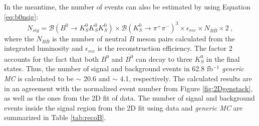 In the meantime, the number of events can also be estimated by using Equation \ref{eq:b0nsig}:
 \begin{equation}\label{eq:b0nsig}
  {N_{sig}}=
\mathcal{B}(B^0 \to K_S^0  K_S^0  K_S^0) \times {\mathcal{B}(K_S^0\to \pi^+\pi^-)^3\times
 	\epsilon_{rec}\times N_{B\bar{B}}\times 2} ~,
 \end{equation}
where the $N_{B\bar{B}}$ is the number of neutral $B$ meson pairs calculated from the integrated luminosity and $\epsilon_{rec}$ is the reconstruction efficiency. The factor 2 accounts for the fact that both $B^0$ and $\overline{B^0}$ can decay to three $K_S^0$ in the final states. Thus, the number of signal and background events in 62.8 fb$^{-1} $ \textit{generic MC} is calculated to be $\sim$ 20.6 and $\sim$ 4.1, respectively. The calculated results are in an agreement with the normalized event number from Figure \ref{fig:2Dgenstack}, as well as the ones from the 2D fit of data. The number of signal and background events inside the signal region from the 2D fit using data and \textit{generic MC} are summarized in Table \ref{tab:recoB}.

 

